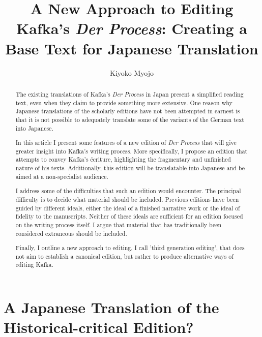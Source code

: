 \documentclass{article}
\author{Kiyoko Myojo}
\title{A New Approach to Editing Kafka's \emph{Der Process}: Creating a Base Text for Japanese Translation
}
\begin{document}
\maketitle

\begin{abstract}
The existing translations of Kafka's \emph{Der Process} in Japan present a simplified reading text, even when they claim to provide something more extensive. One reason why Japanese translations of the scholarly editions have not been attempted in earnest is that it is not possible to adequately translate some of the variants of the German text into Japanese.

In this article I present some features of a new edition of \emph{Der Process} that will give greater insight into Kafka's writing process. More specifically, I propose an edition that attempts to convey Kafka's écriture, highlighting the fragmentary and unfinished nature of his texts. Additionally, this edition will be translatable into Japanese and be aimed at a non-specialist audience. 

I address some of the difficulties that such an edition would encounter. The principal difficulty is to decide what material should be included. Previous editions have been guided by different ideals, either the ideal of a finished narrative work or the ideal of fidelity to the manuscripts. Neither of these ideals are sufficient for an edition focused on the writing process itself. I argue that material that has traditionally been considered extraneous should be included. 

Finally, I outline a new approach to editing, I call 'third generation editing', that does not aim to establish a canonical edition, but rather to produce alternative ways of editing Kafka.
\end{abstract}


\section{A Japanese Translation of the
Historical-critical Edition?}\label{a-japanese-translation-of-the-historical-critical-edition}
\end{document}
